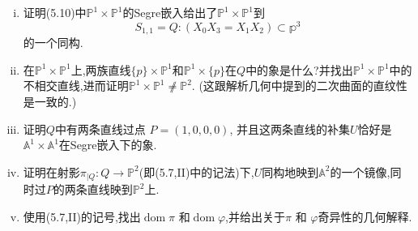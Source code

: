 \documentclass[UTF8]{book}
\begin{document}
		
		\begin{enumerate}[(i)]
			\item 证明(5.10)中$\mathbb{P} ^{1} \times \mathbb{P} ^{1}$的Segre嵌入给出了$\mathbb{P} ^{1} \times \mathbb{P} ^{1}$到
			\begin{equation*}
			S_{1,1}=Q:\left(X_{0} X_{3}=X_{1} X_{2}\right) \subset \mathbb{p}^{3}
			\end{equation*}
			的一个同构.
			\item 在$\mathbb{P} ^{1} \times \mathbb{P} ^{1}$上,两族直线$\{p\} \times \mathbb{P} ^{1}$和$\mathbb{P} ^{1} \times\{p\}$在$ Q $中的象是什么?并找出$\mathbb{P} ^{1} \times \mathbb{P} ^{1}$中的不相交直线,进而证明$\mathbb{P} ^{1} \times \mathbb{P} ^{1} \not \neq \mathbb{P} ^{2}$.
			(这跟解析几何中提到的二次曲面的直纹性是一致的.)
			\item 证明$ Q $中有两条直线过点 $P=(1,0,0,0)$, 并且这两条直线的补集$ U $恰好是$\mathbb{A} ^{1} \times \mathbb{A} ^{1}$在Segre嵌入下的象.
			\item 证明在射影$\pi_{|Q} : Q \rightarrow \mathbb{P} ^{2}$(即(5.7,II)中的记法)下,$ U $同构地映到$\mathbb{A}^{2}$的一个镜像,同时过$ P$的两条直线映到$\mathbb{P} ^{2}$上.
			\item 使用(5.7,II)的记号,找出$ \operatorname{dom} \pi \text { 和} \operatorname{dom} \varphi $,并给出关于$\pi$ 和 $\varphi$奇异性的几何解释.
		\end{enumerate}
	
\end{document}
